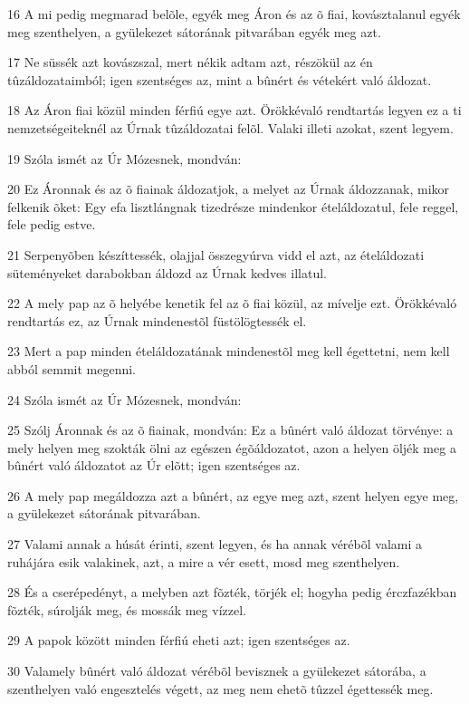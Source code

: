 \par 16 A mi pedig megmarad belõle, egyék meg Áron és az õ fiai, kovásztalanul egyék meg szenthelyen, a gyülekezet sátorának pitvarában egyék meg azt.
\par 17 Ne süssék azt kovászszal, mert nékik adtam azt, részökül az én tûzáldozataimból; igen szentséges az, mint a bûnért és vétekért való áldozat.
\par 18 Az Áron fiai közül minden férfiú egye azt. Örökkévaló rendtartás legyen ez a ti nemzetségeiteknél az Úrnak tûzáldozatai felõl. Valaki illeti azokat, szent legyem.
\par 19 Szóla ismét az Úr Mózesnek, mondván:
\par 20 Ez Áronnak és az õ fiainak áldozatjok, a melyet az Úrnak áldozzanak, mikor felkenik õket: Egy efa lisztlángnak tizedrésze mindenkor ételáldozatul, fele reggel, fele pedig estve.
\par 21 Serpenyõben készíttessék, olajjal összegyúrva vidd el azt, az ételáldozati süteményeket darabokban áldozd az Úrnak kedves illatul.
\par 22 A mely pap az õ helyébe kenetik fel az õ fiai közül, az mívelje ezt. Örökkévaló rendtartás ez, az Úrnak mindenestõl füstölögtessék el.
\par 23 Mert a pap minden ételáldozatának mindenestõl meg kell égettetni, nem kell abból semmit megenni.
\par 24 Szóla ismét az Úr Mózesnek, mondván:
\par 25 Szólj Áronnak és az õ fiainak, mondván: Ez a bûnért való áldozat törvénye: a mely helyen meg szokták ölni az egészen égõáldozatot, azon a helyen öljék meg a bûnért való áldozatot az Úr elõtt; igen szentséges az.
\par 26 A mely pap megáldozza azt a bûnért, az egye meg azt, szent helyen egye meg, a gyülekezet sátorának pitvarában.
\par 27 Valami annak a húsát érinti, szent legyen, és ha annak vérébõl valami a ruhájára esik valakinek, azt, a mire a vér esett, mosd meg szenthelyen.
\par 28 És a cserépedényt, a melyben azt fõzték, törjék el; hogyha pedig érczfazékban fõzték, súrolják meg, és mossák meg vízzel.
\par 29 A papok között minden férfiú eheti azt; igen szentséges az.
\par 30 Valamely bûnért való áldozat vérébõl bevisznek a gyülekezet sátorába, a szenthelyen való engesztelés végett, az meg nem ehetõ tûzzel égettessék meg.

